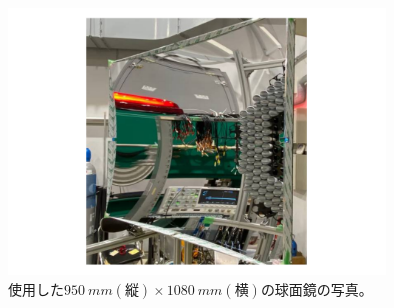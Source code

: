 \begin{figure}
  \centering
  \includegraphics[width=10cm]{images/chapter3/Mirror.pdf}
  \caption{使用した$\SI{950}{mm}(縦)\times\SI{1080}{mm}(横)$の球面鏡の写真。}
  \label{fig:Mirror}
\end{figure}